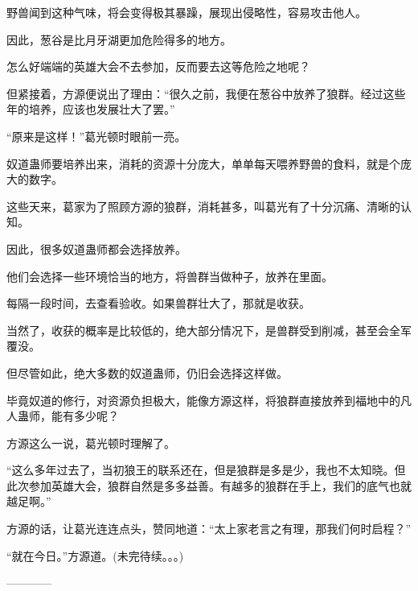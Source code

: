 \begin{this_body}
野兽闻到这种气味，将会变得极其暴躁，展现出侵略性，容易攻击他人。

因此，葱谷是比月牙湖更加危险得多的地方。

怎么好端端的英雄大会不去参加，反而要去这等危险之地呢？

但紧接着，方源便说出了理由：“很久之前，我便在葱谷中放养了狼群。经过这些年的培养，应该也发展壮大了罢。”

“原来是这样！”葛光顿时眼前一亮。

奴道蛊师要培养出来，消耗的资源十分庞大，单单每天喂养野兽的食料，就是个庞大的数字。

这些天来，葛家为了照顾方源的狼群，消耗甚多，叫葛光有了十分沉痛、清晰的认知。

因此，很多奴道蛊师都会选择放养。

他们会选择一些环境恰当的地方，将兽群当做种子，放养在里面。

每隔一段时间，去查看验收。如果兽群壮大了，那就是收获。

当然了，收获的概率是比较低的，绝大部分情况下，是兽群受到削减，甚至会全军覆没。

但尽管如此，绝大多数的奴道蛊师，仍旧会选择这样做。

毕竟奴道的修行，对资源负担极大，能像方源这样，将狼群直接放养到福地中的凡人蛊师，能有多少呢？

方源这么一说，葛光顿时理解了。

“这么多年过去了，当初狼王的联系还在，但是狼群是多是少，我也不太知晓。但此次参加英雄大会，狼群自然是多多益善。有越多的狼群在手上，我们的底气也就越足啊。”

方源的话，让葛光连连点头，赞同地道：“太上家老言之有理，那我们何时启程？”

“就在今日。”方源道。(未完待续。。。)

------------

\end{this_body}


